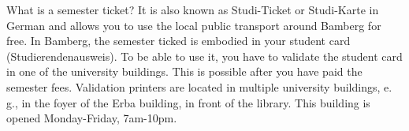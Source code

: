 What is a semester ticket?
It is also known as Studi-Ticket or Studi-Karte in German and allows you to use the local public transport around Bamberg for free.
In Bamberg, the semester ticked is embodied in your student card (Studierendenausweis).
To be able to use it, you have to validate the student card in one of the university buildings.
This is possible after you have paid the semester fees.
Validation printers are located in multiple university buildings, e. g., in the foyer of the Erba building, in front of the library.
This building is opened Monday-Friday, 7am-10pm. 

